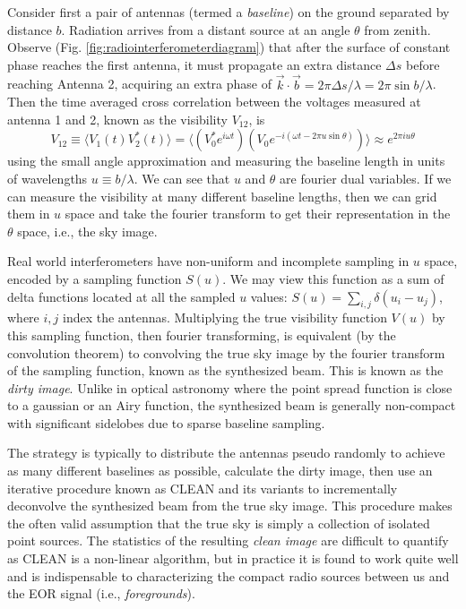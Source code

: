 Consider first a pair of antennas (termed a \textit{baseline}) on the ground separated by distance $b$. Radiation arrives from a distant source at an angle $\theta$ from zenith. Observe (Fig. \ref{fig:radiointerferometerdiagram}) that after the surface of constant phase reaches the first antenna, it must propagate an extra distance $\Delta s$ before reaching Antenna 2, acquiring an extra phase of $\vec{k}\cdot \vec{b}=2\pi\Delta s/\lambda=2\pi\sin b/\lambda$. Then the time averaged cross correlation between the voltages measured at antenna 1 and 2, known as the visibility $V_{12}$, is
\begin{equation}
	V_{12}\equiv\langle V_1(t)V_2^*(t)\rangle=\langle(V_0^* e^{i\omega t})(V_0e^{-i(\omega t-2\pi u\sin \theta)})\rangle \approx e^{2\pi i u\theta}
\end{equation}
using the small angle approximation and measuring the baseline length in units of wavelengths $u\equiv b/\lambda$. We can see that $u$ and $\theta$ are fourier dual variables. If we can measure the visibility at many different baseline lengths, then we can grid them in $u$ space and take the fourier transform to get their representation in the $\theta$ space, i.e., the sky image.

Real world interferometers have non-uniform and incomplete sampling in $u$ space, encoded by a sampling function $S(u)$. We may view this function as a sum of delta functions located at all the sampled $u$ values: $S(u)=\sum_{i,j}\delta(u_i-u_j)$, where $i,j$ index the antennas. Multiplying the true visibility function $V(u)$ by this sampling function, then fourier transforming, is equivalent (by the convolution theorem) to convolving the true sky image by the fourier transform of the sampling function, known as the synthesized beam. This is known as the \textit{dirty image}. Unlike in optical astronomy where the point spread function is close to a gaussian or an Airy function, the synthesized beam is generally non-compact with significant sidelobes due to sparse baseline sampling.  

The strategy is typically to distribute the antennas pseudo randomly to achieve as many different baselines as possible, calculate the dirty image, then use an iterative procedure known as CLEAN \citep{hogbomclean} and its variants to incrementally deconvolve the synthesized beam from the true sky image. This procedure makes the often valid assumption that the true sky is simply a collection of isolated point sources. The statistics of the resulting \textit{clean image} are difficult to quantify as CLEAN is a non-linear algorithm, but in practice it is found to work quite well and is indispensable to characterizing the compact radio sources between us and the EOR signal (i.e., \textit{foregrounds}).

